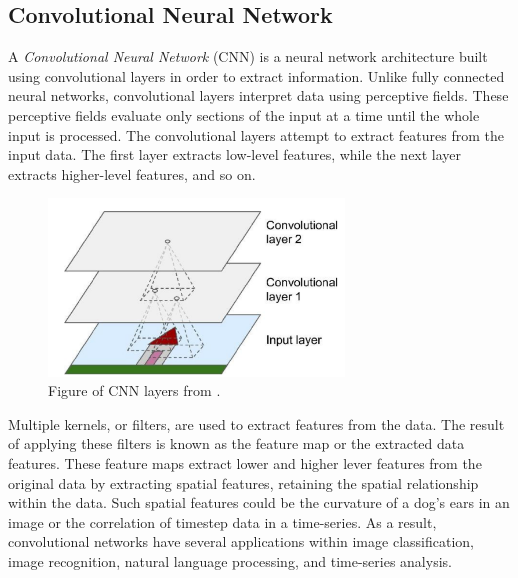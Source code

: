 \subsection{Convolutional Neural Network}
\label{section:BT:CNN}
A \textit{Convolutional Neural Network} (CNN) is a neural network architecture built using convolutional layers in order to extract information.
Unlike fully connected neural networks, convolutional layers interpret data using perceptive fields.
These perceptive fields evaluate only sections of the input at a time until the whole input is processed.
The convolutional layers attempt to extract features from the input data.
The first layer extracts low-level features, while the next layer extracts higher-level features, and so on.

\cite[p.~443-446]{Geron2017}


\begin{figure}[h!]
  \centering
  \includegraphics[width=0.7\textwidth]{./sections/BT/figures/convolution_hands_one_machine_learning.png}
  \hfill
  \caption{Figure of CNN layers from \cite[p.~444]{Geron2017}.}
  \label{fig:convolution}
\end{figure}


Multiple kernels, or filters, are used to extract features from the data.
The result of applying these filters is known as the feature map or the extracted data features.
These feature maps extract lower and higher lever features from the original data by
extracting spatial features, retaining the spatial relationship within the data.
Such spatial features could be the curvature of a dog's ears in an image or the correlation of timestep data in a time-series.
As a result, convolutional networks have several applications within image classification,
image recognition, natural language processing, and time-series analysis.



